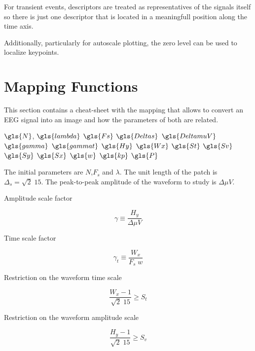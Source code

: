 For transient events, descriptors are treated as representatives of the signals itself so there is just one descriptor that is located in a meaningfull position along the time axis.

Additionally, particularly for autoscale plotting, the zero level can be used to localize keypoints.

\section{Mapping Functions}

This section contains a cheat-sheet with the mapping that allows to convert an EEG signal into an image and how the parameters of both are related.

$\gls{N}$, 
$\gls{lambda}$
$\gls{Fs}$
$\gls{Deltas}$
$\gls{DeltamuV}$
$\gls{gamma}$
$\gls{gammat}$
$\gls{Hy}$
$\gls{Wx}$
$\gls{St}$
$\gls{Sv}$
$\gls{Sy}$
$\gls{Sx}$
$\gls{w}$
$\gls{kp}$
$\gls{P}$

The initial parameters are $N$,$F_s$ and $\lambda$.  The unit length of the patch is $\Delta_s = \sqrt{2} \; 15$.  The peak-to-peak amplitude of the waveform to study is $ \Delta \mu V $.

Amplitude scale factor

\begin{equation}
\gamma \equiv \frac{H_y}{\Delta \mu V}  
\label{eq:gammadefinition}
\end{equation}

Time scale factor

\begin{equation}
\gamma_t \equiv \frac{W_x}{F_s \; w}  
\label{eq:gammatdefinition}
\end{equation}

%

Restriction on the waveform time scale

\begin{equation}
\frac{W_x-1}{\sqrt{2} \; 15}  \geq S_t 
\label{eq:restriction1}
\end{equation}

Restriction on the waveform amplitude scale

\begin{equation}
\frac{H_y-1}{\sqrt{2} \; 15}  \geq S_v 
\label{eq:restriction2}
\end{equation}

